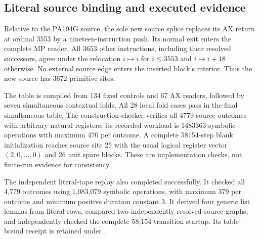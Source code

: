 \subsection{Literal source binding and executed evidence}

Relative to the PA194G source, the sole new source splice replaces its
AX return at ordinal 3553 by a nineteen-instruction push. Its normal exit
enters the complete MP reader. All 3653 other instructions, including
their resolved successors, agree under the relocation
$i\mapsto i$ for $i\le3553$ and $i\mapsto i+18$ otherwise.
No external source edge enters the inserted block's interior.
Thus the new source has 3672 primitive sites.

The table is compiled from 134 fixed controls and 67 AX readers, followed
by seven simultaneous contextual folds. All 28 local fold cases pass in
the final simultaneous table. The construction checker verifies all 4779
source outcomes with arbitrary natural registers; its recorded workload
is 1483363 symbolic operations with maximum 470 per outcome. A complete
58154-step blank initialization reaches source site 25 with the usual
logical register vector $(2,0,\ldots,0)$ and 26 unit spare blocks.
These are implementation checks, not finite-run evidence for consistency.

The independent literal-tape replay also completed successfully. It
checked all 4,779 outcomes using 1,083,079 symbolic operations, with maximum
379 per outcome and minimum positive duration constant 3. It derived
four generic list lemmas from literal rows, compared two independently
resolved source graphs, and independently checked the complete
58,154-transition startup. Its table-bound receipt is retained under
.
